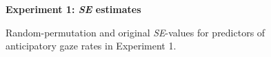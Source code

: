 \documentclass[authoryear, 12pt]{elsarticle}
\begin{document}
\begin{figure}
  \centering
  \textbf{Experiment 1: \textit{SE} estimates}\par\medskip
  \hfill
  \caption{Random-permutation and original \textit{SE}-values for predictors of anticipatory gaze rates in Experiment 1.}
\label{fig:E1-SEs}
\end{figure}
\end{document}
